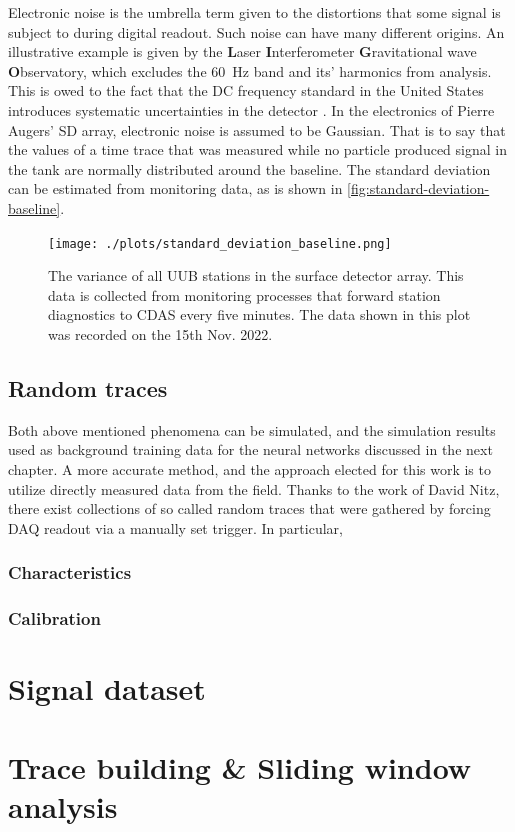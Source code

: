 Electronic noise is the umbrella term given to the distortions that some signal is subject to during digital readout. Such noise can have many different origins.
An illustrative example is given by the \textbf{L}aser \textbf{I}nterferometer \textbf{G}ravitational wave \textbf{O}bservatory, which excludes the \SI{60}{\hertz}
band and its' harmonics from analysis. This is owed to the fact that the DC frequency standard in the United States introduces systematic uncertainties in the
detector \cite{martynov2016sensitivity}. In the electronics of Pierre Augers' SD array, electronic noise is assumed to be Gaussian. That is to say that the 
\SI{}{\ADC} values of a time trace that was measured while no particle produced signal in the tank are normally distributed around the baseline. The standard 
deviation can be estimated from monitoring data, as is shown in \autoref{fig:standard-deviation-baseline}. 

\begin{figure}
	\centering
	\texttt{[image: ./plots/standard\_deviation\_baseline.png]}
	\caption{The variance of all UUB stations in the surface detector array. This data is collected from monitoring processes that forward station diagnostics to 
	CDAS every five minutes. The data shown in this plot was recorded on the 15th Nov. 2022. }
	\label{fig:standard-deviation-baseline}
\end{figure}

\subsection{Random traces}
\label{ssec:random-traces}

Both above mentioned phenomena can be simulated, and the simulation results used as background training data for the neural networks discussed in the next chapter.
A more accurate method, and the approach elected for this work is to utilize directly measured data from the field. Thanks to the work of David Nitz, there exist
collections of so called random traces that were gathered by forcing DAQ readout via a manually set trigger. In particular, 

\subsubsection{Characteristics}
\label{ssec:random-trace-characteristics}



\subsubsection{Calibration}
\label{ssec:random-trace-calibration}


\section{Signal dataset}
\label{sec:signal-dataset}



\section{Trace building \& Sliding window analysis}
\label{sec:sliding-window-analysis}

